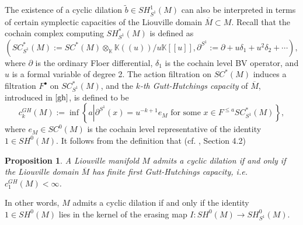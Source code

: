\documentclass[a4paper]{article}
\newtheorem{proposition}[theorem]{Proposition}
\numberwithin{equation}{section}
\begin{document}
The existence of a cyclic dilation $\tilde{b}\in\mathit{SH}_{S^1}^1(M)$ can also be interpreted in terms of certain symplectic capacities of the Liouville domain $\overline{M}\subset M$. Recall that the cochain complex computing $\mathit{SH}_{S^1}^\ast(M)$ is defined as
\begin{equation}\label{eq:SC}
\left(\mathit{SC}^\ast_{S^1}(M):=\mathit{SC}^\ast(M)\otimes_\mathbb{K}\mathbb{K}(\!(u)\!)/u\mathbb{K}[\![u]\!],\partial^{S^1}:=\partial+u\delta_1+u^2\delta_2+\cdots\right),
\end{equation}
where $\partial$ is the ordinary Floer differential, $\delta_1$ is the cochain level BV operator, and $u$ is a formal variable of degree 2. The action filtration on $\mathit{SC}^\ast(M)$ induces a filtration $F^\bullet$ on $\mathit{SC}^\ast_{S^1}(M)$, and the \textit{$k$-th Gutt-Hutchings capacity} of $\overline{M}$, introduced in $\cite{gh}$, is defined to be
\begin{equation}
c_k^\mathit{GH}(M):=\inf\left\{a\left\vert\partial^{S^1}(x)=u^{-k+1}e_M\textrm{ for some }x\in F^{\leq a}\mathit{SC}_{S^1}^\ast(M)\right.\right\},
\end{equation}
where $e_M\in\mathit{SC}^0(M)$ is the cochain level representative of the identity $1\in\mathit{SH}^0(M)$. It follows from the definition that (cf. \cite{yl2}, Section 4.2)

\begin{proposition}
A Liouville manifold $M$ admits a cyclic dilation if and only if the Liouville domain $\overline{M}$ has finite first Gutt-Hutchings capacity, i.e. $c_1^\mathit{GH}(M)<\infty$.
\end{proposition}

In other words, $M$ admits a cyclic dilation if and only if the identity $1\in\mathit{SH}^0(M)$ lies in the kernel of the erasing map $I:\mathit{SH}^0(M)\rightarrow\mathit{SH}_{S^1}^0(M)$.
\bigskip
\end{document}
